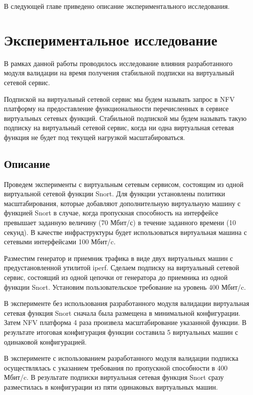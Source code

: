 \documentclass[oneside,final,14pt,a4paper]{extreport}
\begin{document}
В следующей главе приведено описание экспериментального исследования.





\chapter{Экспериментальное исследование}
\label{chap:expirements}
В рамках данной работы проводилось исследование влияния разработанного модуля валидации на время получения стабильной подписки на виртуальный сетевой сервис. 

Подпиской на виртуальный сетевой сервис мы будем называть запрос в NFV платформу на предоставление функциональности перечисленных в сервисе виртуальных сетевых функций. Стабильной подпиской мы будем называть такую подписку на виртуальный сетевой сервис, когда ни одна виртуальная сетевая функция не будет под текущей нагрузкой масштабироваться.


\section{Описание}
Проведем эксперименты с виртуальным сетевым сервисом, состоящим из одной виртуальной сетевой функции Snort\cite{bib:snort}. Для функции установлены политики масштабирования, которые добавляют дополнительную виртуальную машину с функцией Snort в случае, когда пропускная способность на интерфейсе превышает заданную величину (70 Мбит/с) в течение заданного времени (10 секунд). В качестве инфраструктуры будет использоваться виртуальная машина с сетевыми интерфейсами 100 Мбит/c.

Разместим генератор и приемник трафика в виде двух виртуальных машин с предустановленной утилитой iperf\cite{bib:iperf}. Сделаем подписку на виртуальный сетевой сервис, состоящий из одной цепочки от генератора до приемника из одной функции Snort. Установим пользовательское требование на уровень 400 Мбит/c.

В эксперименте без использования разработанного модуля валидации виртуальная сетевая функция Snort сначала была размещена в минимальной конфигурации. Затем NFV платформа 4 раза произвела масштабирование указанной функции. В результате итоговая конфигурация функции составила 5 виртуальных машин с одинаковой конфигурацией.

В эксперименте с использованием разработанного модуля валидации подписка осуществлялась с указанием требования по пропускной способности в 400 Мбит/c. В результате подписки виртуальная сетевая функция Snort сразу разместилась в конфигурации из пяти одинаковых виртуальных машин.
\end{document}
